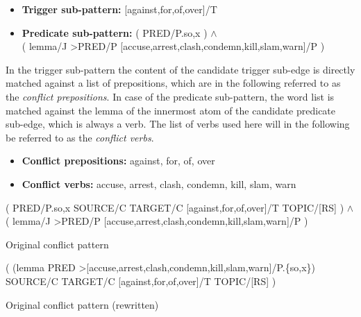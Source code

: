 \documentclass[11pt]{scrreprt}
\begin{document}
{\begin{itemize}
	\item \textbf{\textsf{Trigger sub-pattern:}} \textsf{[against,for,of,over]/T}
	\item \textbf{\textsf{Predicate sub-pattern:}}
		\textsf{( PRED/P.{so,x} ) \(\wedge\) \\ ( lemma/J >PRED/P [accuse,arrest,clash,condemn,kill,slam,warn]/P )}
\end{itemize}

In the trigger sub-pattern the content of the candidate trigger sub-edge is directly matched against a list of prepositions, which are in the following referred to as the \textit{conflict prepositions}. In case of the predicate sub-pattern, the word list is matched against the lemma of the innermost atom of the candidate predicate sub-edge, which is always a verb. The list of verbs used here will in the following be referred to as the \textit{conflict verbs}.

\begin{itemize}
	\item \textbf{\textsf{Conflict prepositions:}} against, for, of, over
	\item \textbf{\textsf{Conflict verbs:}} accuse, arrest, clash, condemn, kill, slam, warn
\end{itemize}


\begin{pattern}
  \normalfont\sffamily
  \centering
  ( PRED/P.{so,x} SOURCE/C TARGET/C [against,for,of,over]/T TOPIC/[RS] ) \(\wedge\) \\
  ( lemma/J >PRED/P [accuse,arrest,clash,condemn,kill,slam,warn]/P )
  \caption{Original conflict pattern}
  \label{pat:original-conflict}
\end{pattern}

\begin{pattern}
  \normalfont\sffamily
  \centering
  ( (lemma PRED >[accuse,arrest,clash,condemn,kill,slam,warn]/P.\{so,x\}) \\
  SOURCE/C TARGET/C [against,for,of,over]/T TOPIC/[RS] ) 

  \caption{Original conflict pattern (rewritten)}
  \label{pat:original-conflict-rewritten}
\end{pattern}



}
\end{document}

